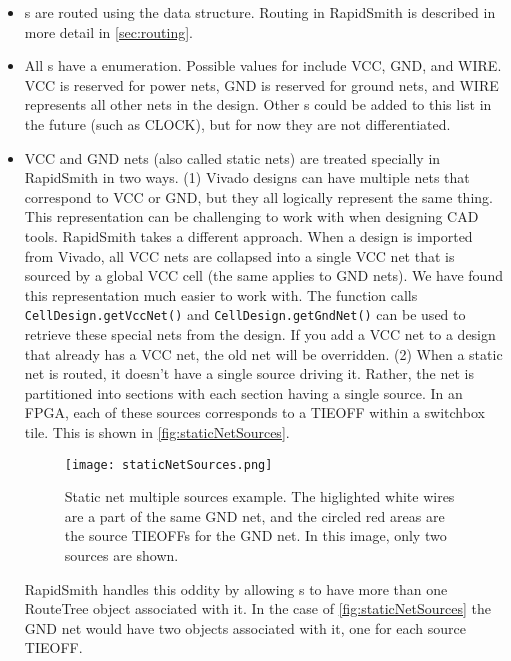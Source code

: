 \begin{itemize}
  \item {}s are routed using the  data structure.
  Routing in RapidSmith is described in more detail in \autoref{sec:routing}.
  \item All s have a  enumeration. Possible values for
   include VCC, GND, and WIRE. VCC is reserved for power nets, GND
  is reserved for ground nets, and WIRE represents all other nets in the design.
  Other s could be added to this list in the future (such
  as CLOCK), but for now they are not differentiated.
  \item VCC and GND nets (also called static nets) are treated specially in
  RapidSmith in two ways. (1) Vivado designs can have multiple nets that
  correspond to VCC or GND, but they all logically represent the same thing.
  This representation can be challenging to work with when designing CAD tools.
  RapidSmith takes a different approach. When a design is imported from Vivado,
  all VCC nets are collapsed into a single VCC net that is sourced by a global
  VCC cell (the same applies to GND nets). We have found this representation
  much easier to work with. The function calls \texttt{CellDesign.getVccNet()}
  and \texttt{CellDesign.getGndNet()} can be used to retrieve these special
  nets from the design. If you add a VCC net to a design that already has a VCC
  net, the old net will be overridden. (2) When a static net is routed, it
  doesn't have a single source driving it. Rather, the net is partitioned
  into sections with each section having a single source. In an FPGA, each of
  these sources corresponds to a TIEOFF within a switchbox tile. This is shown
  in \autoref{fig:staticNetSources}.
  
  \begin{figure}[H]
   \centering
   \texttt{[image: staticNetSources.png]}
   \caption{Static net multiple sources example. The higlighted white wires are
   a part of the same GND net, and the circled red areas are the source TIEOFFs
   for the GND net. In this image, only two sources are shown.}
   \label{fig:staticNetSources}
  \end{figure}
  
  RapidSmith handles this oddity by allowing s to have more than
  one RouteTree object associated with it. In the case of
  \autoref{fig:staticNetSources} the GND net would have two 
  objects associated with it, one for each source TIEOFF.
   

\end{itemize}
